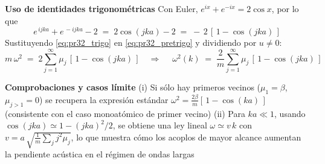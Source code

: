 \documentclass{article}
\begin{document}
\noindent\textbf{Uso de identidades trigonométricas}\;
Con Euler, $e^{ix}+e^{-ix}=2\cos x$, por lo que
\begin{equation}
  e^{\,i jka}+e^{\,-i jka}-2
  \;=\;
  2\cos(jka)-2
  \;=\;
  -\,2\,[\,1-\cos(jka)\,]
  \label{eq:pr32_trigo}
\end{equation}
Sustituyendo \eqref{eq:pr32_trigo} en \eqref{eq:pr32_pretrigo} y dividiendo por $u\neq 0$:
\begin{equation}
  m\,\omega^2
  \;=\;
  2\sum_{j=1}^{\infty}\mu_j\,[\,1-\cos(jka)\,]
  \quad\Rightarrow\quad
  \boxed{\;
    \omega^2(k) \;=\; \frac{2}{m} \sum_{j=1}^{\infty} \mu_j \,[\,1 - \cos(jka)\,]
  \;}
  \label{eq:pr32_disp_final}
\end{equation}

\noindent\textbf{Comprobaciones y casos límite}\;
(i) Si sólo hay primeros vecinos ($\mu_1=\beta$, $\mu_{j>1}=0$) se recupera la expresión estándar
\(
\omega^2=\frac{2\beta}{m}[\,1-\cos(ka)\,]
\)
\; (consistente con el caso monoatómico de primer vecino)\;
(ii) Para $ka\ll 1$, usando $\cos(jka)\simeq 1-(jka)^2/2$, se obtiene una ley lineal $\omega\simeq v\,k$ con
\(
v=a\,\sqrt{\tfrac{1}{m}\sum_{j} j^2\mu_j}
\),
lo que muestra cómo los acoplos de mayor alcance aumentan la pendiente acústica en el régimen de ondas largas
\end{document}

